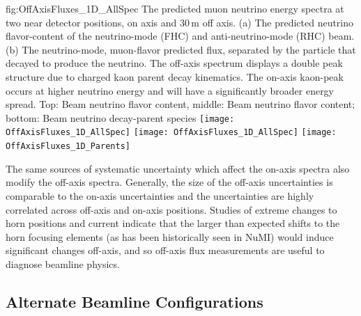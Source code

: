 
\begin{dunefigure}{fig:OffAxisFluxes_1D_AllSpec}
{The predicted muon neutrino energy spectra at two near detector positions, on axis and $30\,\textrm{m}$ off axis. (a) The predicted neutrino flavor-content of the neutrino-mode (FHC) and anti-neutrino-mode (RHC) beam. (b) The neutrino-mode, muon-flavor predicted flux, separated by the particle that decayed to produce the neutrino. The off-axis spectrum displays a double peak structure due to charged kaon parent decay kinematics. The on-axis kaon-peak occurs at higher neutrino energy and will have a significantly broader energy spread. Top: Beam neutrino flavor content, middle: Beam neutrino flavor content; bottom: Beam neutrino decay-parent species}
    \texttt{[image: OffAxisFluxes\_1D\_AllSpec]}
    \texttt{[image: OffAxisFluxes\_1D\_AllSpec]}
  \texttt{[image: OffAxisFluxes\_1D\_Parents]}    
    \end{dunefigure}


The same sources of systematic uncertainty which affect the on-axis spectra also modify the off-axis spectra.  Generally, the size of the off-axis uncertainties is comparable to the on-axis uncertainties and the uncertainties are highly correlated across off-axis and on-axis positions. Studies of extreme changes to horn positions and current indicate that the larger than expected shifts to the horn focusing elements (as has been historically seen in NuMI) would induce significant changes off-axis, and so off-axis flux measurements are useful to diagnose beamline physics.



\subsection{Alternate Beamline Configurations}

